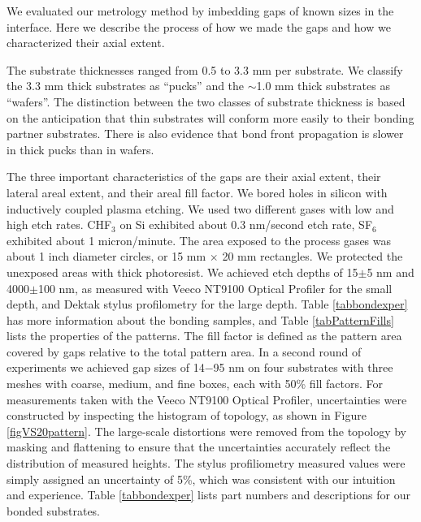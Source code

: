 \documentclass[osajnl,preprint,showpacs,superscriptaddress,12pt]{revtex4-1} %
\begin{document}
We evaluated our metrology method by imbedding gaps of known sizes in the interface.  Here we describe the process of how we made the gaps and how we characterized their axial extent.  

The substrate thicknesses ranged from 0.5 to 3.3 mm per substrate.  We classify the 3.3 mm thick substrates as ``pucks'' and the $\sim$1.0 mm thick substrates as ``wafers''.  The distinction between the two classes of substrate thickness is based on the anticipation that thin substrates will conform more easily to their bonding partner substrates.  There is also evidence that bond front propagation is slower in thick pucks \cite{2007ApOpt..46.6793H} than in wafers.  

The three important characteristics of the gaps are their axial extent, their lateral areal extent, and their areal fill factor.  We bored holes in silicon with inductively coupled plasma etching.  We used two different gases with low and high etch rates.  CHF$_3$ on Si exhibited about 0.3 nm/second etch rate, SF$_6$ exhibited about 1 micron/minute.  The area exposed to the process gases was about 1 inch diameter circles, or 15 mm $\times$ 20 mm rectangles.  We protected the unexposed areas with thick photoresist.  We achieved etch depths of 15$\pm$5 nm and 4000$\pm$100 nm, as measured with Veeco NT9100 Optical Profiler for the small depth, and Dektak stylus profilometry for the large depth.  Table \ref{tabbondexper} has more information about the bonding samples, and Table \ref{tabPatternFills} lists the properties of the patterns.  The fill factor is defined as the pattern area covered by gaps relative to the total pattern area.  In a second round of experiments we achieved gap sizes of 14$-$95 nm on four substrates with three meshes with coarse, medium, and fine boxes, each with 50\% fill factors.  For measurements taken with the Veeco NT9100 Optical Profiler, uncertainties were constructed by inspecting the histogram of topology, as shown in Figure \ref{figVS20pattern}.  The large-scale distortions were removed from the topology by masking and flattening to ensure that the uncertainties accurately reflect the distribution of measured heights.  The stylus profiliometry measured values were simply assigned an uncertainty of 5\%, which was consistent with our intuition and experience.  Table \ref{tabbondexper} lists part numbers and descriptions for our bonded substrates.
\end{document}
